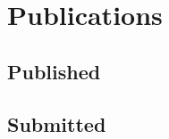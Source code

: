 \documentclass[11pt,letterpaper,sans,unicode]{moderncv}
\begin{document}
{%


\section{Publications}




\subsection{Published}

\begin{etaremune}[leftmargin=8mm]

\end{etaremune}

\subsection{Submitted}

}
\end{document}
